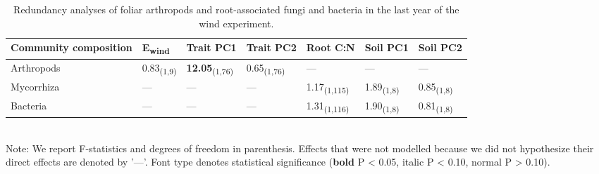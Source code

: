 \documentclass[11pt]{article}
\begin{document}
\begin{table}
\centering
\caption{Redundancy analyses of foliar arthropods and
root-associated fungi and bacteria in the last year of the wind experiment.}
\label{wRedund}
\begin{tabular}{@{}lllllll@{}}
\toprule
Community composition & E\textsubscript{wind} & Trait PC1 &
Trait PC2 & Root C:N & Soil PC1 &
Soil PC2\tabularnewline
\midrule
Arthropods & 0.83\textsubscript{(1,9)} & \textbf{12.05}\textsubscript{(1,76)} & 0.65\textsubscript{(1,76)} & --- & --- &
---\tabularnewline
Mycorrhiza & --- & --- & --- & 1.17\textsubscript{(1,115)} & 1.89\textsubscript{(1,8)} &
0.85\textsubscript{(1,8)}\tabularnewline
Bacteria & --- & --- & --- & 1.31\textsubscript{(1,116)} & 1.90\textsubscript{(1,8)} &
0.81\textsubscript{(1,8)}\tabularnewline
\bottomrule
\end{tabular}
\bigskip{}
\\
{\footnotesize Note: We report F-statistics and degrees
of freedom in parenthesis. Effects that were not modelled because we did not hypothesize their direct effects are denoted by '---'. Font type denotes statistical significance
(\textbf{bold} P \textless{} 0.05, italic P \textless{} 0.10, normal P
\textgreater{} 0.10).}
\end{table}
\end{document}
